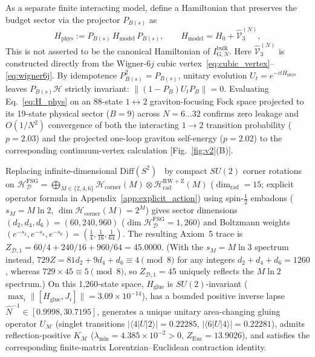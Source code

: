\documentclass[onecolumn,11pt,aps,prd,amsmath,amssymb,nofootinbib,floatfix]{revtex4-2}
\newcommand{\scrD}{\mathscr{D}}
\newcommand{\calH}{\mathcal{H}}
\newcommand{\calM}{\mathcal{M}}
\begin{document}
As a separate finite interacting model, define a Hamiltonian that preserves the budget sector via the projector $P_{B(s)}$ as
\begin{equation}\label{eq:H_phys}
H_{\mathrm{phys}} := P_{B(s)}\,H_{\mathrm{model}}\,P_{B(s)}, \qquad H_{\mathrm{model}} = H_0 + \widehat{\mathcal{V}}_3^{(N)},
\end{equation}
This is not asserted to be the canonical Hamiltonian of $I_{\mathrm{G},N}^{\mathrm{bulk}}$. Here $\widehat{\mathcal{V}}_3^{(N)}$ is constructed directly from the Wigner-$6j$ cubic vertex~\eqref{eq:cubic_vertex}--\eqref{eq:wigner6j}. By idempotence $P_{B(s)}^2=P_{B(s)}$, unitary evolution $U_t=e^{-it H_{\mathrm{phys}}}$ leaves $P_{B(s)}\calH$ strictly invariant: $\|(1-P_B)U_t P_B\|=0$. Evaluating Eq.~\eqref{eq:H_phys} on an 88-state $1\leftrightarrow 2$ graviton-focusing Fock space projected to its 19-state physical sector ($B=9$) across $N=6\dots 32$ confirms zero leakage and $O(1/N^2)$ convergence of both the interacting $1\to 2$ transition probability ($p=2.03$) and the projected one-loop graviton self-energy ($p=2.02$) to the corresponding continuum-vertex calculation [Fig.~\ref{fig:v2}(B)].

Replacing infinite-dimensional $\mathrm{Diff}(S^2)$~\cite{CiambelliKlinger2026} by compact $SU(2)$ corner rotations on $\calH_{\scrD}^{\mathrm{FSG}}=\bigoplus_{M\in\{2,4,6\}}\calH_{\mathrm{corner}}(M)\otimes\calH_{\mathrm{rad}}^{\mathrm{RW+Z}}(M)$ ($\dim_{\mathrm{rad}}=15$; explicit operator formula in Appendix~\ref{app:explicit_action}) using spin-$\frac{1}{2}$ embadons ($s_M=M\ln 2$, $\dim\calH_{\mathrm{corner}}(M)=2^M$) gives sector dimensions $(d_2,d_4,d_6)=(60,240,960)$ ($\dim\calH_{\scrD}^{\mathrm{FSG}}=1{,}260$) and Boltzmann weights $(e^{-s_2},e^{-s_4},e^{-s_6})=(\frac{1}{4},\frac{1}{16},\frac{1}{64})$. The resulting Axiom~5 trace is $Z_{\scrD,1}=60/4+240/16+960/64=45.0000$. (With the $s_M=M\ln 3$ spectrum instead, $729 Z=81 d_2+9 d_4+d_6\equiv 4\pmod 8$ for any integers $d_2+d_4+d_6=1260$, whereas $729\times 45\equiv 5\pmod 8$, so $Z_{\scrD,1}=45$ uniquely reflects the $M\ln 2$ spectrum.) On this 1,260-state space, $H_{\mathrm{glue}}$ is $SU(2)$-invariant ($\max_i\|[H_{\mathrm{glue}},J_i]\|=3.09\times 10^{-14}$), has a bounded positive inverse lapse $\widehat{N}^{-1}\in[0.9998,30.7195]$, generates a unique unitary area-changing gluing operator $U_{\calM}$ (singlet transitions $|\langle 4|U|2\rangle|=0.22285$, $|\langle 6|U|4\rangle|=0.22281$), admits reflection-positive $K_{\calM}$ ($\lambda_{\min}=4.385\times 10^{-2}>0$, $Z_{\mathrm{Euc}}=13.9026$), and satisfies the corresponding finite-matrix Lorentzian--Euclidean contraction identity.
\end{document}
